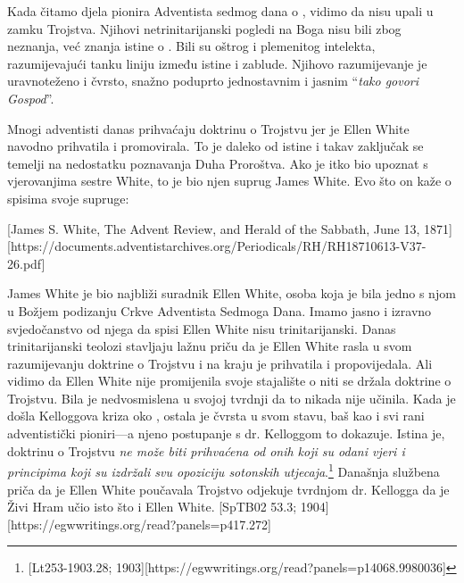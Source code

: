 Kada čitamo djela pionira Adventista sedmog dana o , vidimo da nisu upali u zamku Trojstva. Njihovi netrinitarijanski pogledi na Boga nisu bili zbog neznanja, već znanja istine o . Bili su oštrog i plemenitog intelekta, razumijevajući tanku liniju između istine i zablude. Njihovo razumijevanje  je uravnoteženo i čvrsto, snažno poduprto jednostavnim i jasnim “\textit{tako govori Gospod}”.

Mnogi adventisti danas prihvaćaju doktrinu o Trojstvu jer je Ellen White navodno prihvatila i promovirala. To je daleko od istine i takav zaključak se temelji na nedostatku poznavanja Duha Proroštva. Ako je itko bio upoznat s vjerovanjima sestre White, to je bio njen suprug James White. Evo što on kaže o spisima svoje supruge:

[James S. White, The Advent Review, and Herald of the Sabbath, June 13, 1871][https://documents.adventistarchives.org/Periodicals/RH/RH18710613-V37-26.pdf]

James White je bio najbliži suradnik Ellen White, osoba koja je bila jedno s njom u Božjem podizanju Crkve Adventista Sedmoga Dana. Imamo jasno i izravno svjedočanstvo od njega da spisi Ellen White nisu trinitarijanski. Danas trinitarijanski teolozi stavljaju lažnu priču da je Ellen White rasla u svom razumijevanju doktrine o Trojstvu i na kraju je prihvatila i propovijedala. Ali vidimo da Ellen White nije promijenila svoje stajalište o  niti se držala doktrine o Trojstvu. Bila je nedvosmislena u svojoj tvrdnji da to nikada nije učinila. Kada je došla Kelloggova kriza oko , ostala je čvrsta u svom stavu, baš kao i svi rani adventistički pioniri—a njeno postupanje s dr. Kelloggom to dokazuje. Istina je, doktrinu o Trojstvu \textit{ne može biti prihvaćena od onih koji su odani vjeri i principima koji su izdržali svu opoziciju sotonskih utjecaja}.\footnote{[Lt253-1903.28; 1903][https://egwwritings.org/read?panels=p14068.9980036]} Današnja službena priča da je Ellen White poučavala Trojstvo odjekuje tvrdnjom dr. Kellogga da je Živi Hram učio isto što i Ellen White. [SpTB02 53.3; 1904][https://egwwritings.org/read?panels=p417.272]

